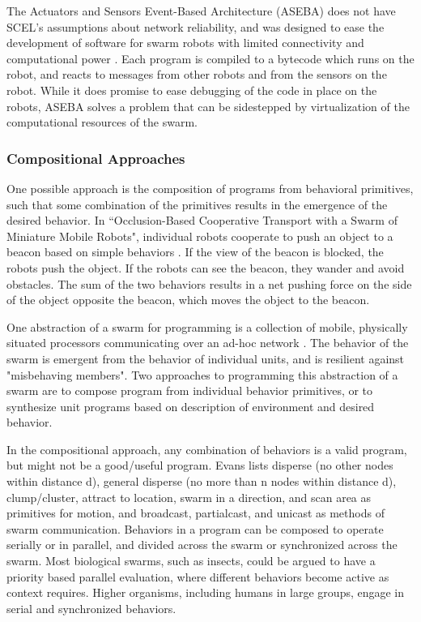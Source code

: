\documentclass[]{article}
\begin{document}
The Actuators and Sensors Event-Based Architecture (ASEBA) does not have SCEL's assumptions about network reliability, and was designed to ease the development of software for swarm robots with limited connectivity and computational power \cite{magnenat2008scripting}. 
Each program is compiled to a bytecode which runs on the robot, and reacts to messages from other robots and from the sensors on the robot. 
While it does promise to ease debugging of the code in place on the robots, ASEBA solves a problem that can be sidestepped by virtualization of the computational resources of the swarm. 

\subsubsection{Compositional Approaches}

One possible approach is the composition of programs from behavioral primitives, such that some combination of the primitives results in the emergence of the desired behavior. 
In ``Occlusion-Based Cooperative Transport with a Swarm of Miniature Mobile Robots", individual robots cooperate to push an object to a beacon based on simple behaviors \cite{chen2015occlusion}. 
If the view of the beacon is blocked, the robots push the object. 
If the robots can see the beacon, they wander and avoid obstacles. 
The sum of the two behaviors results in a net pushing force on the side of the object opposite the beacon, which moves the object to the beacon. 

One abstraction of a swarm for programming is a collection of mobile, physically situated processors communicating over an ad-hoc network \cite{evans2000programming}. The behavior of the swarm is emergent from the behavior of individual units, and is  resilient against "misbehaving members".
Two approaches to programming this abstraction of a swarm are to compose program from individual behavior primitives, or to synthesize unit programs based on description of environment and desired behavior. 

In the compositional approach, any combination of behaviors is a valid program, but might not be a good/useful program. 
Evans lists disperse (no other nodes within distance d), general disperse (no more than n nodes within distance d), clump/cluster, attract to location, swarm in a direction, and scan area as primitives for motion, and broadcast, partialcast, and unicast as methods of swarm communication.
Behaviors in a program can be composed to operate serially or in parallel, and divided across the swarm or synchronized across the swarm. 
Most biological swarms, such as insects, could be argued to have a priority based parallel evaluation, where different behaviors become active as context requires.
Higher organisms, including humans in large groups, engage in serial and synchronized behaviors. %
\end{document}
